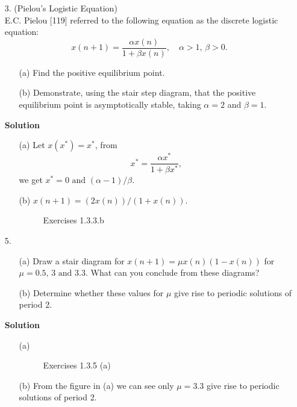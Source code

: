 \begin{enumerate}
    \item[3.] (Pielou's Logistic Equation) \\
        E.C. Pielou [119] referred to the following equation as the discrete logistic equation:
        $$
            x(n+1)=\frac{\alpha x(n)}{1+\beta x(n)},\quad\alpha>1,\,\beta>0.
        $$
        \begin{itemize}
            \item[(a)] Find the positive equilibrium point.
            \item[(b)] Demonstrate, using the stair step diagram, that the positive equilibrium point is asymptotically stable, taking $\alpha=2$ and $\beta=1$.
        \end{itemize}
        \textbf{Solution}
        \begin{itemize}
            \item[(a)] Let $x(x^*)=x^*$, from
                $$x^*=\frac{\alpha x^*}{1+\beta x^*},$$
                we get $x^*=0\text{ and }(\alpha-1)/\beta$.
            \item[(b)] $x(n+1)=(2x(n))/(1+x(n))$.
                \begin{figure}[H]
                    \centering
                    \caption{Exercises 1.3.3.b}
                    \label{fig:exercises-1.3.3.b}
                \end{figure}
        \end{itemize}
    \item[5.]
        \begin{itemize}
            \item[(a)] Draw a stair diagram for $x(n+1)=\mu x(n)(1-x(n))$ for $\mu=0.5,\,3\text{ and }3.3$. What can you conclude from these diagrams?
            \item[(b)] Determine whether these values for $\mu$ give rise to periodic solutions of period 2.
        \end{itemize}
        \textbf{Solution}
        \begin{itemize}
            \item[(a)] 
                \begin{figure}[H]
                    \centering
                    \caption{Exercises 1.3.5 (a)}
                    \label{fig:exercises-1.3.5.a}
                \end{figure}
            \item[(b)] From the figure in (a) we can see only $\mu=3.3$ give rise to periodic solutions of period 2.

\end{itemize}
\end{enumerate}
